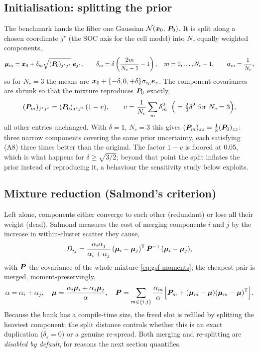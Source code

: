 \subsection{Initialisation: splitting the prior}
The benchmark hands the filter one Gaussian $\mathcal{N}\!\left(\bm{x}_0,\,\bm{P}_0\right)$.  It is split along a chosen
coordinate $j^\star$ (the SOC axis for the cell model) into $N_c$ equally weighted components,
\begin{equation}
  \bm\mu_m = \bm{x}_0 + \delta_m\sqrt{(\bm{P}_0)_{j^\star j^\star}}\;\bm e_{j^\star},
  \qquad
  \delta_m = \delta\left(\frac{2m}{N_c-1}-1\right),\quad m = 0,\dots,N_c-1,
  \qquad \alpha_m = \frac{1}{N_c},
  \label{eq:gsf-split-means}
\end{equation}
so for $N_c = 3$ the means are $\bm{x}_0 + \{-\delta,0,+\delta\}\sigma_{z_0}\bm e_{z}$.  The
component covariances are shrunk so that the mixture reproduces $\bm{P}_0$ exactly,
\begin{equation}
  (\bm{P}_m)_{j^\star j^\star} = (\bm{P}_0)_{j^\star j^\star}\,(1 - v), \qquad
  v = \frac{1}{N_c}\sum_m \delta_m^2
  \;\;\Big(= \tfrac23\delta^2 \text{ for } N_c=3\Big),
  \label{eq:gsf-split-cov}
\end{equation}
all other entries unchanged.  With $\delta = 1$, $N_c = 3$ this gives
$(\bm{P}_m)_{zz} = \frac13(\bm{P}_0)_{zz}$: three narrow components covering the same prior
uncertainty, each satisfying (A8) three times better than the original.  The factor $1-v$ is floored
at \num{0.05}, which is what happens for $\delta \ge \sqrt{3/2}$; beyond that point the split
inflates the prior instead of reproducing it, a behaviour the sensitivity study below exploits.

\subsection{Mixture reduction (Salmond's criterion)}
Left alone, components either converge to each other (redundant) or lose all their weight (dead).
Salmond \cite{salmond1990mixture} measures the cost of merging components $i$ and $j$ by the
increase in within-cluster scatter they cause,
\begin{equation}
  D_{ij} = \frac{\alpha_i\alpha_j}{\alpha_i+\alpha_j}\,
           (\bm\mu_i-\bm\mu_j)^{\mathsf{T}}\,\bar{\bm{P}}^{-1}\,(\bm\mu_i-\bm\mu_j),
  \label{eq:gsf-salmond}
\end{equation}
with $\bar{\bm{P}}$ the covariance of the whole mixture \eqref{eq:gsf-moments}; the cheapest pair is
merged, moment-preservingly,
\begin{equation}
  \alpha = \alpha_i+\alpha_j,\quad
  \bm\mu = \frac{\alpha_i\bm\mu_i + \alpha_j\bm\mu_j}{\alpha},\quad
  \bm{P} = \sum_{m\in\{i,j\}}\frac{\alpha_m}{\alpha}\Big[\bm{P}_m + (\bm\mu_m-\bm\mu)(\bm\mu_m-\bm\mu)^{\mathsf{T}}\Big].
  \label{eq:gsf-merge}
\end{equation}
Because the bank has a compile-time size, the freed slot is refilled by splitting the heaviest
component; the split distance  controls whether this is an exact duplication
($\delta_s=0$) or a genuine re-spread.  Both merging and re-splitting are \emph{disabled by
default}, for reasons the next section quantifies.

